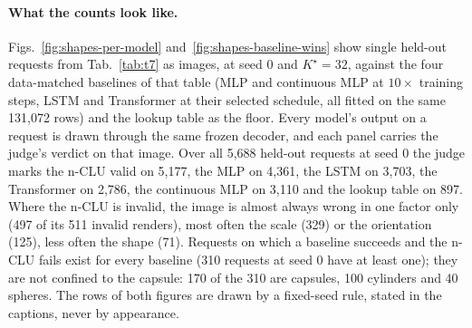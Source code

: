 \documentclass{article} %
\newcommand{\Kstar}{\ensuremath{K^{\star}}}
\begin{document}
\paragraph{What the counts look like.} Figs.~\ref{fig:shapes-per-model} and~\ref{fig:shapes-baseline-wins}
show single held-out requests from Tab.~\ref{tab:t7} as images, at seed 0 and $\Kstar=32$, against the %
four data-matched baselines of that table (MLP and continuous MLP at $10\times$ training steps, LSTM and
Transformer at their selected schedule, all fitted on the same 131,072 rows) and the lookup table as the %
floor. Every model's output on a request is drawn through the same frozen decoder, and each panel
carries the judge's verdict on that image. Over all 5,688 held-out requests at seed 0 the judge marks %
the n-CLU valid on 5,177, the MLP on 4,361, the LSTM on 3,703, the Transformer on 2,786, the continuous %
MLP on 3,110 and the lookup table on 897. %
Where the n-CLU is invalid, the image is almost always wrong in one factor only (497 of its 511 invalid %
renders), most often the scale (329) or the orientation (125), less often the shape (71). %
Requests on which a baseline succeeds and the n-CLU fails exist for every baseline (310 requests at %
seed 0 have at least one); they are not confined to the capsule: 170 of the 310 are capsules, 100 %
cylinders and 40 spheres. %
The rows of both figures are drawn by a fixed-seed rule, stated in the captions, never by appearance.
\end{document}

